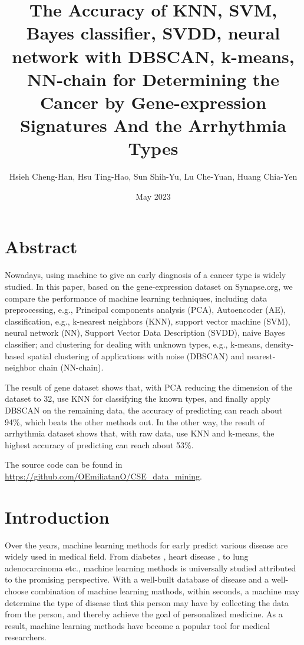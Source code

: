 \documentclass[twocolumn,10pt]{article}
\begin{document}
\title{The Accuracy of KNN, SVM, Bayes classifier, SVDD, neural network with DBSCAN, k-means, NN-chain for Determining the Cancer by Gene-expression Signatures And the Arrhythmia Types}

\author{Hsieh Cheng-Han, Hsu Ting-Hao, Sun Shih-Yu, Lu Che-Yuan, Huang Chia-Yen}
\date{May 2023}
\maketitle

\section*{Abstract}
Nowadays, using machine to give an early diagnosis of a cancer type is widely studied. 
In this paper, based on the gene-expression dataset on Synapse.org, we compare the performance of machine 
learning techniques, including data preprocessing, e.g., Principal components analysis (PCA), Autoencoder 
(AE), classification, e.g., k-nearest neighbors (KNN), support vector machine (SVM), neural network (NN), 
Support Vector Data Description (SVDD), naive Bayes classifier; 
and clustering for dealing with unknown types, e.g., k-means, density-based spatial clustering of 
applications with noise (DBSCAN) and nearest-neighbor chain (NN-chain).

The result of gene dataset shows that, with PCA reducing the dimension of the dataset to 32, use KNN for 
classifying the known types, and finally apply DBSCAN on the remaining data, the accuracy of predicting 
can reach about 94\%, which beats the other methods out. In the other way, the result of arrhythmia 
dataset shows that, with raw data, use KNN and k-means, the highest accuracy of predicting can reach about 
53\%.

The source code can be found in \href{https://github.com/OEmiliatanO/CSE\_data\_mining}{https://github.com/OEmiliatanO/CSE\_data\_mining}.

\section{Introduction}
\label{sec:Introduction}
Over the years, machine learning methods for early predict various disease are widely used in medical field. 
\cite{kourou2015machine} \cite{cruz2006applications} From diabetes \cite{kavakiotis2017machine}, 
heart disease \cite{learning2017heart}, to lung adenocarcinoma \cite{huang2020machine} etc., machine learning 
methods is universally studied attributed to the promising perspective. With a well-built database of disease 
and a well-choose combination of machine learning mathods, within seconds, a machine may determine the type of 
disease that this person may have by collecting the data from the person, and thereby achieve the goal of 
personalized medicine. As a result, machine learning methods have become a popular tool for medical researchers. 
\end{document}
